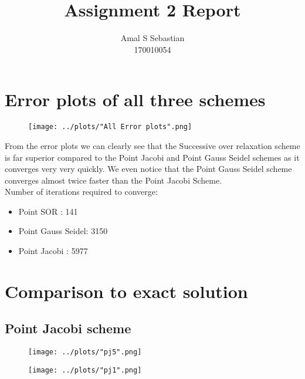 \documentclass[a4paper,twoside,11pt]{article}
\begin{document}
\title{\vspace{-2\baselineskip}
Assignment 2 Report}
\author{Amal S Sebastian \\ {170010054}}

\maketitle

\section*{Error plots of all three schemes}

\begin{figure}[h]
  \centering
  \texttt{[image: ../plots/"All Error plots".png]}
\end{figure}

From the error plots we can clearly see that the Successive over relaxation scheme is far superior compared to the Point Jacobi and Point Gauss Seidel schemes as it converges very very quickly. We even notice that the Point Gauss Seidel scheme converges almost twice faster than the Point Jacobi Scheme.\\

Number of iterations required to converge:
\begin{itemize}
  \item Point SOR : 141
  \item Point Gauss Seidel: 3150
  \item Point Jacobi : 5977
\end{itemize}
\newpage
\section*{Comparison to exact solution}
\subsection*{Point Jacobi scheme}
  \begin{figure}[h]
    \centering
    \begin{minipage}{.5\textwidth}
      \centering
      \texttt{[image: ../plots/"pj5".png]}
      \label{fig:test1}
    \end{minipage}%
    \begin{minipage}{.5\textwidth}
      \centering
      \texttt{[image: ../plots/"pj1".png]}
      \label{fig:test2}
    \end{minipage}
    \end{figure}
\end{document}
